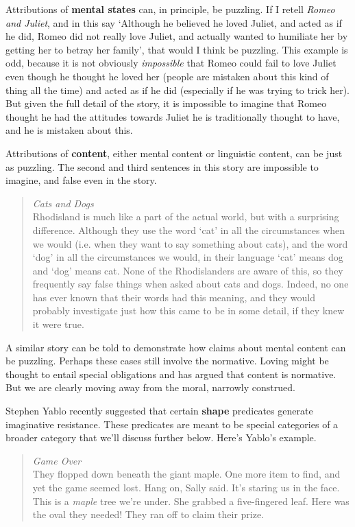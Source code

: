 Attributions of \textbf{mental states} can, in principle, be puzzling. If I retell \textit{Romeo and Juliet}, and in this say `Although he believed he loved Juliet, and acted as if he did, Romeo did not really love Juliet, and actually wanted to humiliate her by getting her to betray her family', that would I think be puzzling. This example is odd, because it is not obviously \textit{impossible} that Romeo could fail to love Juliet even though he thought he loved her (people are mistaken about this kind of thing all the time) and acted as if he did (especially if he was trying to trick her). But given the full detail of the story, it is impossible to imagine that Romeo thought he had the attitudes towards Juliet he is traditionally thought to have, and he is mistaken about this.

Attributions of \textbf{content}, either mental content or linguistic content, can be just as puzzling. The second and third sentences in this story are impossible to imagine, and false even in the story.

\begin{quote}
\textit{Cats and Dogs} \\
Rhodisland is much like a part of the actual world, but with a surprising difference. Although they use the word `cat' in all the circumstances when we would (i.e. when they want to say something about cats), and the word `dog' in all the circumstances we would, in their language `cat' means dog and `dog' means cat. None of the Rhodislanders are aware of this, so they frequently say false things when asked about cats and dogs. Indeed, no one has ever known that their words had this meaning, and they would probably investigate just how this came to be in some detail, if they knew it were true.
\end{quote}

\noindent A similar story can be told to demonstrate how claims about mental content can be puzzling. Perhaps these cases still involve the normative. Loving might be thought to entail special obligations and \citet{Kripke1982} has argued that content is normative. But we are clearly moving away from the moral, narrowly construed.

Stephen Yablo recently suggested that certain \textbf{shape} predicates generate imaginative resistance. These predicates are meant to be special categories of a broader category that we'll discuss further below. Here's Yablo's example.

\begin{quote}
\textit{Game Over} \\
They flopped down beneath the giant maple. One more item to find, and yet the game seemed lost. Hang on, Sally said. It's staring us in the face. This is a \textit{maple} tree we're under. She grabbed a five-fingered leaf. Here was the oval they needed! They ran off to claim their prize. \cite[485, title added]{Yablo2002}
\end{quote}

